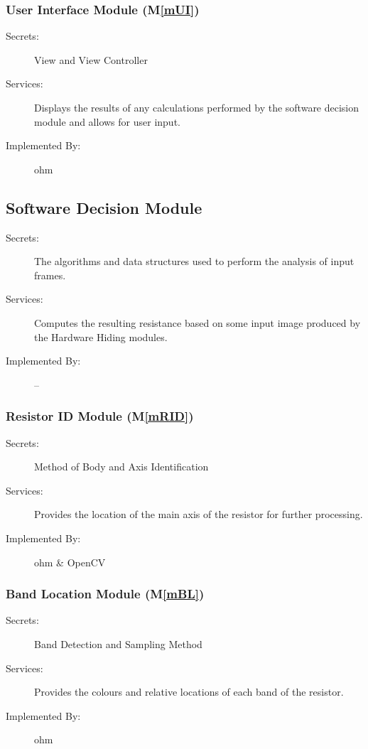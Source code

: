 \documentclass[12pt, titlepage]{article}
\newcommand{\mref}[1]{M\ref{#1}}
\begin{document}
\subsubsection{User Interface Module (\mref{mUI})}

\begin{description}
\item[Secrets:] View and View Controller
\item[Services:] Displays the results of any calculations performed by the software decision module and allows for user input.
\item[Implemented By:] ohm
\end{description}

\subsection{Software Decision Module}

\begin{description}
\item[Secrets:] The algorithms and data structures used to perform the analysis of input frames.
\item[Services:] Computes the resulting resistance based on some input image produced by the Hardware Hiding modules.
\item[Implemented By:] --
\end{description}

\subsubsection{Resistor ID Module (\mref{mRID})}

\begin{description}
\item[Secrets:] Method of Body and Axis Identification
\item[Services:] Provides the location of the main axis of the resistor for further processing.
\item[Implemented By:] ohm \& OpenCV
\end{description}

\subsubsection{Band Location Module (\mref{mBL})}

\begin{description}
\item[Secrets:] Band Detection and Sampling Method
\item[Services:] Provides the colours and relative locations of each band of the resistor.
\item[Implemented By:] ohm
\end{description}
\end{document}
